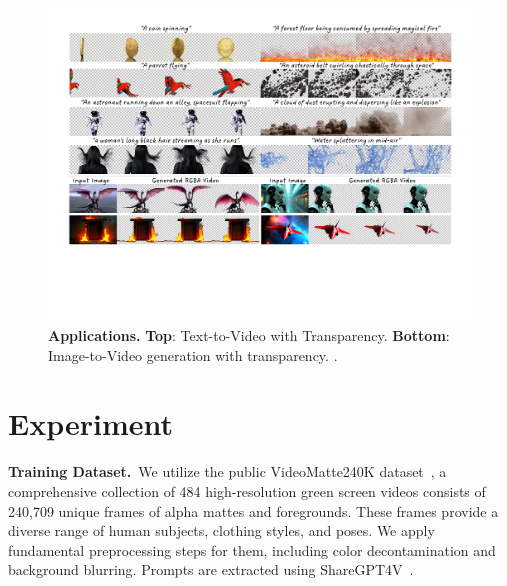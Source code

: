 \begin{figure}[htbp]
    \centering
    \includegraphics[width=1.0\linewidth]{figs/exp-applications.pdf}
    \vspace{-0.2in}
    \caption{\textbf{Applications.} \textbf{Top}: Text-to-Video with Transparency. \textbf{Bottom}: Image-to-Video generation with transparency.
.}
    \label{fig-applications}
    \vspace{-0.1in}
\end{figure}


\section{Experiment}
\label{sec:exp}


\noindent\textbf{Training Dataset.}~We utilize the public VideoMatte240K dataset~\cite{lin2021real}, a comprehensive collection of 484 high-resolution green screen videos consists of 240,709 unique frames of alpha mattes and foregrounds. These frames provide a diverse range of human subjects, clothing styles, and poses. We apply fundamental preprocessing steps for them, including color decontamination and background blurring. Prompts are extracted using ShareGPT4V~\cite{chen2023sharegpt4v}. 

